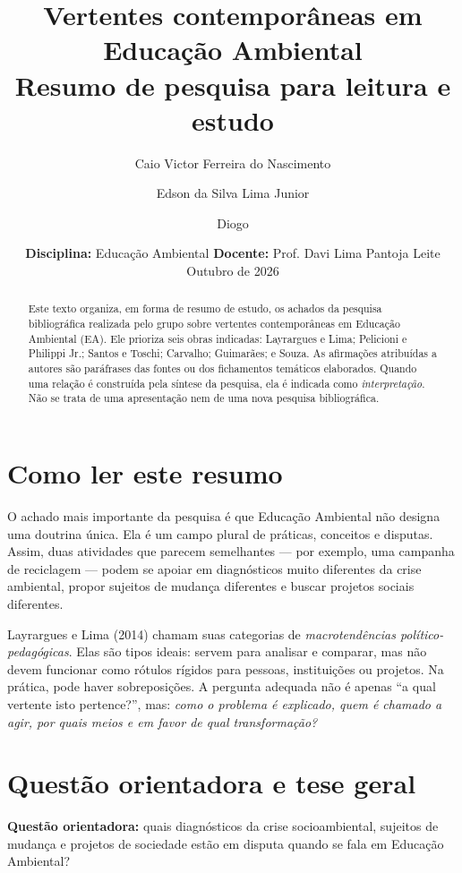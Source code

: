 \documentclass[12pt,a4paper]{article}
\title{Vertentes contemporâneas em Educação Ambiental\\\large Resumo de pesquisa para leitura e estudo}
\author{Caio Victor Ferreira do Nascimento \and Edson da Silva Lima Junior \and Diogo}
\date{\textbf{Disciplina:} Educação Ambiental \quad\textbullet\quad \textbf{Docente:} Prof. Davi Lima Pantoja Leite\\[1ex]Outubro de 2026}
\begin{document}
\maketitle

\begin{abstract}
Este texto organiza, em forma de resumo de estudo, os achados da pesquisa bibliográfica realizada pelo grupo sobre vertentes contemporâneas em Educação Ambiental (EA). Ele prioriza seis obras indicadas: Layrargues e Lima; Pelicioni e Philippi Jr.; Santos e Toschi; Carvalho; Guimarães; e Souza. As afirmações atribuídas a autores são paráfrases das fontes ou dos fichamentos temáticos elaborados. Quando uma relação é construída pela síntese da pesquisa, ela é indicada como \emph{interpretação}. Não se trata de uma apresentação nem de uma nova pesquisa bibliográfica.
\end{abstract}

\tableofcontents
\newpage

\section{Como ler este resumo}

O achado mais importante da pesquisa é que Educação Ambiental não designa uma doutrina única. Ela é um campo plural de práticas, conceitos e disputas. Assim, duas atividades que parecem semelhantes --- por exemplo, uma campanha de reciclagem --- podem se apoiar em diagnósticos muito diferentes da crise ambiental, propor sujeitos de mudança diferentes e buscar projetos sociais diferentes.

Layrargues e Lima (2014) chamam suas categorias de \emph{macrotendências político-pedagógicas}. Elas são tipos ideais: servem para analisar e comparar, mas não devem funcionar como rótulos rígidos para pessoas, instituições ou projetos. Na prática, pode haver sobreposições. A pergunta adequada não é apenas ``a qual vertente isto pertence?'', mas: \emph{como o problema é explicado, quem é chamado a agir, por quais meios e em favor de qual transformação?}

\section{Questão orientadora e tese geral}

\textbf{Questão orientadora:} quais diagnósticos da crise socioambiental, sujeitos de mudança e projetos de sociedade estão em disputa quando se fala em Educação Ambiental?
\end{document}
